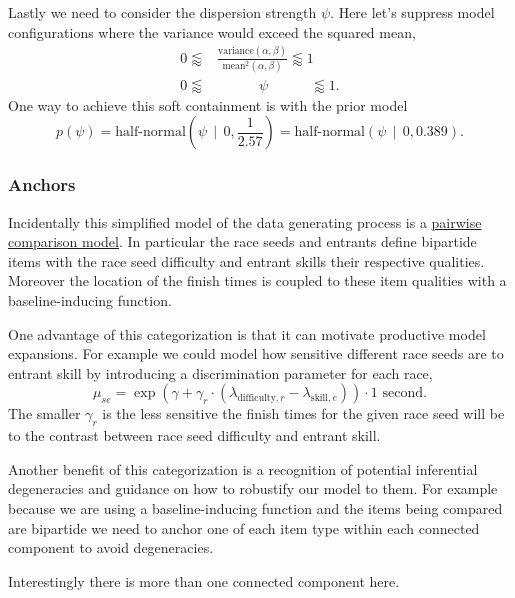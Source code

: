 \documentclass[
  letterpaper,
  DIV=11,
  numbers=noendperiod]{scrartcl}
\begin{document}
Lastly we need to consider the dispersion strength \(\psi\). Here let's
suppress model configurations where the variance would exceed the
squared mean, \begin{align*}
0 \lessapprox
&\frac{ \text{variance}(\alpha, \beta) }{ \text{mean}^{2}(\alpha, \beta) }
\lessapprox 1
\\
0 \lessapprox & \quad\quad\;\;\;\, \psi \quad\quad\;\;\;\,  \lessapprox 1.
\end{align*} One way to achieve this soft containment is with the prior
model \[
p( \psi )
= \text{half-normal} \left( \psi \;\, \bigg| \;\, 0, \frac{1}{2.57} \right)
= \text{half-normal} \left( \psi \;\, \bigg| \;\, 0, 0.389 \right).
\]

\subsubsection{Anchors}\label{anchors}

Incidentally this simplified model of the data generating process is a
\href{https://betanalpha.github.io/assets/chapters_html/pairwise_comparison_modeling.html}{pairwise
comparison model}. In particular the race seeds and entrants define
bipartide items with the race seed difficulty and entrant skills their
respective qualities. Moreover the location of the finish times is
coupled to these item qualities with a baseline-inducing function.

One advantage of this categorization is that it can motivate productive
model expansions. For example we could model how sensitive different
race seeds are to entrant skill by introducing a discrimination
parameter for each race, \[
\mu_{se}
=
\exp(
\gamma
+ \gamma_{r} \cdot (  \lambda_{\mathrm{difficulty}, r}
                    - \lambda_{\mathrm{skill}, e}) )
\cdot 1 \text{ second}.
\] The smaller \(\gamma_{r}\) is the less sensitive the finish times for
the given race seed will be to the contrast between race seed difficulty
and entrant skill.

Another benefit of this categorization is a recognition of potential
inferential degeneracies and guidance on how to robustify our model to
them. For example because we are using a baseline-inducing function and
the items being compared are bipartide we need to anchor one of each
item type within each connected component to avoid degeneracies.

Interestingly there is more than one connected component here.
\end{document}
